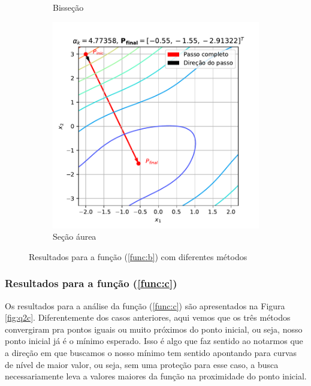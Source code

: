 \documentclass[10pt, a4paper]{article}
\begin{document}
\begin{figure}[htpb]
\begin{subfigure}[b]{0.32\textwidth}
      \caption{Bisseção}
      \label{fig:q2b_2}
  \end{subfigure}
  \hfill
  \begin{subfigure}[b]{0.32\textwidth}
      \centering
      \includegraphics[width=\textwidth]{images/q2b_3.pdf}
      \caption{Seção áurea}
      \label{fig:q2b_3}
  \end{subfigure}
     \caption{Resultados para a função (\ref{func:b}) com diferentes métodos}
     \label{fig:q2b}
\end{figure}

\subsubsection{Resultados para a função (\ref{func:c})}

Os resultados para a análise da função (\ref{func:c}) são apresentados na Figura \ref{fig:q2c}. Diferentemente dos casos anteriores, aqui vemos
que os três métodos convergiram pra pontos iguais ou muito próximos do ponto inicial, ou seja, nosso ponto inicial já é o 
mínimo esperado. Isso é algo que faz sentido ao notarmos que a direção em que buscamos o nosso mínimo tem sentido apontando
para curvas de nível de maior valor, ou seja, sem uma proteção para esse caso, a busca necessariamente leva a valores maiores da função na proximidade
do ponto inicial.
\end{document}

